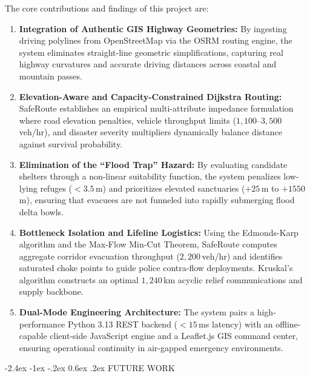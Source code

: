 \documentclass[12pt,oneside]{report}
\makeatletter
\renewcommand{\section}{\@startsection{section}{1}{\z@}%
  {-2.4ex \@plus -1ex \@minus -.2ex}%
  {0.6ex \@plus .2ex}%
  {\normalfont\large\bfseries}}
\makeatother
\begin{document}
The core contributions and findings of this project are:
\begin{enumerate}
    \item \textbf{Integration of Authentic GIS Highway Geometries:} By ingesting driving polylines from OpenStreetMap via the OSRM routing engine, the system eliminates straight-line geometric simplifications, capturing real highway curvatures and accurate driving distances across coastal and mountain passes.
    \item \textbf{Elevation-Aware and Capacity-Constrained Dijkstra Routing:} SafeRoute establishes an empirical multi-attribute impedance formulation where road elevation penalties, vehicle throughput limits ($1,100$--$3,500$\,veh/hr), and disaster severity multipliers dynamically balance distance against survival probability.
    \item \textbf{Elimination of the ``Flood Trap'' Hazard:} By evaluating candidate shelters through a non-linear suitability function, the system penalizes low-lying refuges ($< 3.5$\,m) and prioritizes elevated sanctuaries ($+25$\,m to $+1550$\,m), ensuring that evacuees are not funneled into rapidly submerging flood delta bowls.
    \item \textbf{Bottleneck Isolation and Lifeline Logistics:} Using the Edmonds-Karp algorithm and the Max-Flow Min-Cut Theorem, SafeRoute computes aggregate corridor evacuation throughput ($2,200$\,veh/hr) and identifies saturated choke points to guide police contra-flow deployments. Kruskal's algorithm constructs an optimal $1,240$\,km acyclic relief communications and supply backbone.
    \item \textbf{Dual-Mode Engineering Architecture:} The system pairs a high-performance Python 3.13 REST backend ($< 15$\,ms latency) with an offline-capable client-side JavaScript engine and a Leaflet.js GIS command center, ensuring operational continuity in air-gapped emergency environments.
\end{enumerate}

\section{FUTURE WORK}
\end{document}
